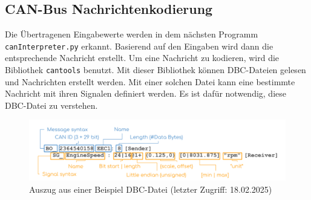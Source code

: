 \subsection{CAN-Bus Nachrichtenkodierung} \label{sec:canBus}
Die Übertragenen Eingabewerte werden in dem nächsten Programm \texttt{canInterpreter.py} erkannt. Basierend auf den
Eingaben wird dann die entsprechende Nachricht erstellt. Um eine Nachricht zu kodieren, wird die Bibliothek \texttt{cantools} benutzt.
Mit dieser Bibliothek können DBC-Dateien gelesen und Nachrichten erstellt werden. Mit einer solchen Datei kann eine
bestimmte Nachricht mit ihren Signalen definiert werden. Es ist dafür notwendig, diese DBC-Datei zu verstehen.
\begin{figure}[H]
    \centering
    \includegraphics[scale=0.2]{images/CAN-DBC-File-Format-Explained-Intro-Basics_2.png}
    \caption{Auszug aus einer Beispiel DBC-Datei \cite{cssElectronics}(letzter Zugriff: 18.02.2025)}
    \label{fig:dbcfile}
\end{figure}

